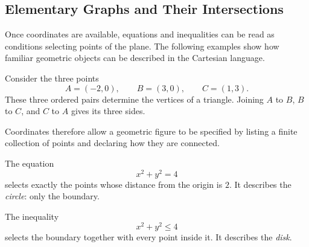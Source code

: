 \subsection{Elementary Graphs and Their Intersections}

Once coordinates are available, equations and inequalities can be read as conditions selecting points of the plane. The following examples show how familiar geometric objects can be described in the Cartesian language.

\begin{examplebox}
Consider the three points
\[
A=(-2,0),\qquad B=(3,0),\qquad C=(1,3).
\]
These three ordered pairs determine the vertices of a triangle. Joining $A$ to $B$, $B$ to $C$, and $C$ to $A$ gives its three sides.

\begin{center}
\end{center}

Coordinates therefore allow a geometric figure to be specified by listing a finite collection of points and declaring how they are connected.
\end{examplebox}

\begin{examplebox}
The equation
\[
x^2+y^2=4
\]
selects exactly the points whose distance from the origin is $2$. It describes the \emph{circle}: only the boundary.

The inequality
\[
x^2+y^2\leq 4
\]
selects the boundary together with every point inside it. It describes the \emph{disk}.

\begin{center}
\end{center}
\end{examplebox}

